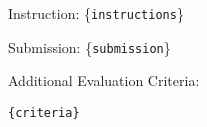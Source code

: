 \begin{tcolorbox}[
    breakable,
    boxrule=0.5pt,
    sharp corners,
    fontupper=\small,
    colback=orange!5!white,
    colframe=orange!80!black,
    title={LLM Judge Prompt}
]
Instruction: \{\texttt{instructions}\}

Submission: \{\texttt{submission}\}

Additional Evaluation Criteria:

\begin{verbatim}
{criteria}
\end{verbatim}
\end{tcolorbox}
